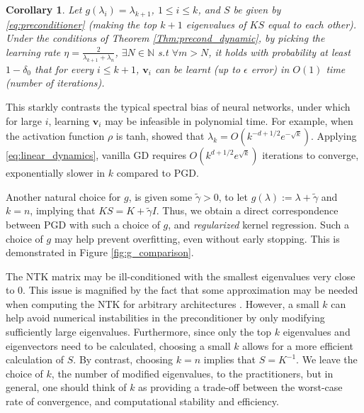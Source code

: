 \documentclass[10pt]{article} %
\theoremstyle{plain}
\newtheorem{corollary}[theorem]{Corollary}
\theoremstyle{definition}
\theoremstyle{remark}
\newcommand{\vv}{\mathbf{v}}
\begin{document}
\begin{corollary}
    Let $g(\lambda_i)=\lambda_{k+1}$, $1 \le i \le k$, and $S$ be given by \eqref{eq:preconditioner} (making the top $k+1$ eigenvalues of $KS$ equal to each other). Under the conditions of Theorem \ref{Thm:precond_dynamic}, by picking the learning rate $\eta=\frac{2}{\lambda_{k+1}+\lambda_{n}}$, $\exists N\in \mathbb{N}$ s.t $\forall m>N$, it holds with probability at least $1-\delta_0$ that for every $i\leq k+1$, $\vv_i$ can be learnt (up to $\epsilon$ error) in $O(1)$ time (number of iterations).
\end{corollary} 

This starkly contrasts the typical spectral bias of neural networks, under which for large $i$, learning $\vv_i$ may be infeasible in polynomial time. For example, when the activation function $\rho$ is tanh, \citet{murray2022characterizing} showed that $\lambda_k=O\left(k^{-d+1/2}e^{-\sqrt{k}}\right)$. Applying \eqref{eq:linear_dynamics}, vanilla GD requires $O\left(k^{d+1/2}e^{\sqrt{k}}\right)$ iterations to converge, exponentially slower in $k$ compared to PGD.

Another natural choice for $g$, is given some $\tilde{\gamma}>0$, to let $g(\lambda) := \lambda + \tilde{\gamma}$ and $k=n$, implying that $KS=K+\tilde{\gamma}I$. Thus, we obtain a direct correspondence between PGD with such a choice of $g$, and \emph{regularized} kernel regression. Such a choice of $g$ may help prevent overfitting, even without early stopping. This is demonstrated in Figure \ref{fig:g_comparison}. 

The NTK matrix may be ill-conditioned with the smallest eigenvalues very close to 0. This issue is magnified by the fact that some approximation may be needed when computing the NTK for arbitrary architectures \cite{novak2022fast, mohamadi2023fast}. However, a small $k$ can help avoid numerical instabilities in the preconditioner by only modifying sufficiently large eigenvalues. Furthermore, since only the top $k$ eigenvalues and eigenvectors need to be calculated, choosing a small $k$ allows for a more efficient calculation of $S$. By contrast, choosing $k=n$ implies that $S=K^{-1}$. We leave the choice of $k$, the number of modified eigenvalues, to the practitioners, but in general, one should think of $k$ as providing a trade-off between the worst-case rate of convergence, and computational stability and efficiency. 
\end{document}
